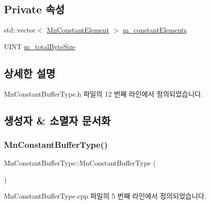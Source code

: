 \subsection*{Private 속성}
\begin{DoxyCompactItemize}
\item 
std\+::vector$<$ \hyperlink{class_m_n_l_1_1_mn_constant_element}{Mn\+Constant\+Element} $>$ \hyperlink{class_m_n_l_1_1_mn_constant_buffer_type_abbcebdac92c25f66a090acb6b902573d}{m\+\_\+constant\+Elements}
\item 
U\+I\+NT \hyperlink{class_m_n_l_1_1_mn_constant_buffer_type_a27af6863155a8cc6edb48df620a86b56}{m\+\_\+total\+Byte\+Size}
\end{DoxyCompactItemize}


\subsection{상세한 설명}


Mn\+Constant\+Buffer\+Type.\+h 파일의 12 번째 라인에서 정의되었습니다.



\subsection{생성자 \& 소멸자 문서화}
\mbox{\label{class_m_n_l_1_1_mn_constant_buffer_type_adb400b9153ea587f4f1ed5173c9fe0e5}} 
\subsubsection{\texorpdfstring{Mn\+Constant\+Buffer\+Type()}{MnConstantBufferType()}}
{\footnotesize\ttfamily Mn\+Constant\+Buffer\+Type\+::\+Mn\+Constant\+Buffer\+Type (\begin{DoxyParamCaption}{ }\end{DoxyParamCaption})}



Mn\+Constant\+Buffer\+Type.\+cpp 파일의 5 번째 라인에서 정의되었습니다.

\mbox{\label{class_m_n_l_1_1_mn_constant_buffer_type_a379082879b3a4e9220ea3ded514b8982}} 
